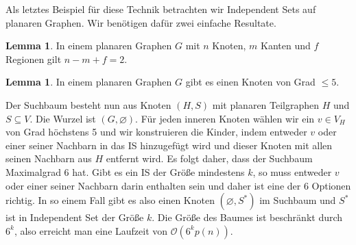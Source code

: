 \documentclass[a4paper, 12pt]{article}
\theoremstyle{plain}
\theoremstyle{definition}
\theoremstyle{lemma}
\newtheorem{lemma}[theorem]{Lemma}
\theoremstyle{remark}
\theoremstyle{corollary}
\theoremstyle{example}
\begin{document}
	Als letztes Beispiel für diese Technik betrachten wir Independent Sets auf planaren Graphen. Wir benötigen dafür zwei einfache Resultate.
	\begin{lemma}
		In einem planaren Graphen $G$ mit $n$ Knoten, $m$ Kanten und $f$ Regionen gilt $n-m+f = 2$.
	\end{lemma}
	\begin{lemma}
		In einem planaren Graphen $G$ gibt es einen Knoten von Grad $\leq 5$.
	\end{lemma}
	Der Suchbaum besteht nun aus Knoten $(H,S)$ mit planaren Teilgraphen $H$ und $S \subseteq V$. Die Wurzel ist $(G,\varnothing)$. Für jeden inneren Knoten wählen wir ein $v \in V_H$ von Grad höchstens 5 und wir konstruieren die Kinder, indem entweder $v$ oder einer seiner Nachbarn in das IS hinzugefügt wird und dieser Knoten mit allen seinen Nachbarn aus $H$ entfernt wird. Es folgt daher, dass der Suchbaum Maximalgrad 6 hat. Gibt es ein IS der Größe mindestens $k$, so muss entweder $v$ oder einer seiner Nachbarn darin enthalten sein und daher ist eine der 6 Optionen richtig. In so einem Fall gibt es also einen Knoten $(\varnothing, S^*)$ im Suchbaum und $S^*$ ist in Independent Set der Größe $k$. Die Größe des Baumes ist beschränkt durch $6^k$, also erreicht man eine Laufzeit von $\mathcal{O}(6^k p(n))$.
\end{document}
